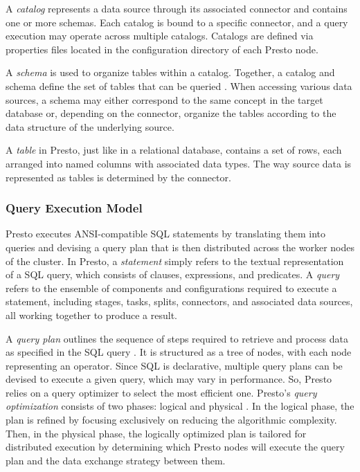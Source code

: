 \documentclass[conference]{IEEEtran}
\begin{document}
A \textit{catalog} represents a data source through its associated connector and contains one or more schemas. Each catalog is bound to a specific connector, and a query execution may operate across multiple catalogs. Catalogs are defined via properties files located in the configuration directory of each Presto node.

A \textit{schema} is used to organize tables within a catalog. Together, a catalog and schema define the set of tables that can be queried \cite{b3}. When accessing various data sources, a schema may either correspond to the same concept in the target database or, depending on the connector, organize the tables according to the data structure of the underlying source.

A \textit{table} in Presto, just like in a relational database, contains a set of rows, each arranged into named columns with associated data types. The way source data is represented as tables is determined by the connector.


\subsubsection{Query Execution Model}

Presto executes ANSI-compatible SQL statements by translating them into queries and devising a query plan that is then distributed across the worker nodes of the cluster.
\newline \indent In Presto, a \textit{statement} simply refers to the textual representation of a SQL query, which consists of clauses, expressions, and predicates.
A \textit{query} refers to the ensemble of components and configurations required to execute a statement, including stages, tasks, splits, connectors, and associated data sources, all working together to produce a result.

A \textit{query plan} outlines the sequence of steps required to retrieve and process data as specified in the SQL query \cite{b3}. It is structured as a tree of nodes, with each node representing an operator. Since SQL is declarative, multiple query plans can be devised to execute a given query, which may vary in performance. So, Presto relies on a query optimizer to select the most efficient one.
Presto’s \textit{query optimization} consists of two phases: logical and physical \cite{b3}. In the logical phase, the plan is refined by focusing exclusively on reducing the algorithmic complexity. Then, in the physical phase, the logically optimized plan is tailored for distributed execution by determining which Presto nodes will execute the query plan and the data exchange strategy between them.
\end{document}
